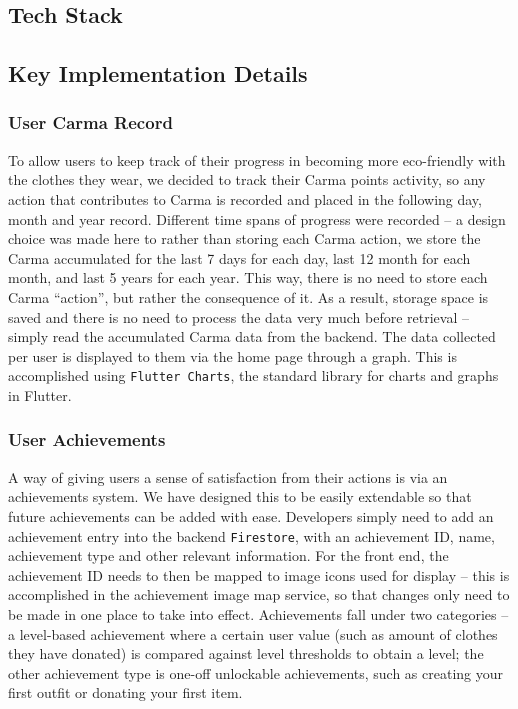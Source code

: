 \documentclass[a4paper, 11pt]{article}
\begin{document}
    \subsection{Tech Stack}
    \subsection{Key Implementation Details} 
      \subsubsection{User Carma Record}
       To allow users to keep track of their progress in becoming more eco-friendly with the clothes they wear, we decided to track their Carma points activity, so any action that contributes to Carma is recorded and placed in the following day, month and year record. Different time spans of progress were recorded – a design choice was made here to rather than storing each Carma action, we store the Carma accumulated for the last 7 days for each day, last 12 month for each month, and last 5 years for each year. This way, there is no need to store each Carma “action”, but rather the consequence of it. As a result, storage space is saved and there is no need to process the data very much before retrieval – simply read the accumulated Carma data from the backend.
       \newline\newline
       The data collected per user is displayed to them via the home page through a graph. This is accomplished using \texttt{Flutter Charts}, the standard library for charts and graphs in Flutter.

      
      \subsubsection{User Achievements}
       A way of giving users a sense of satisfaction from their actions is via an achievements system. We have designed this to be easily extendable so that future achievements can be added with ease. Developers simply need to add an achievement entry into the backend \texttt{Firestore}, with an achievement ID, name, achievement type and other relevant information. For the front end, the achievement ID needs to then be mapped to image icons used for display – this is accomplished in the achievement image map service, so that changes only need to be made in one place to take into effect. 
       \newline\newline
       Achievements fall under two categories – a level-based achievement where a certain user value (such as amount of clothes they have donated) is compared against level thresholds to obtain a level; the other achievement type is one-off unlockable achievements, such as creating your first outfit or donating your first item.  
    
\end{document}
